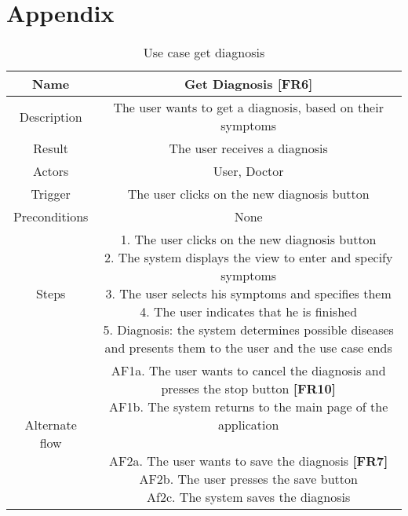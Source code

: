 

\chapter{Appendix}
\begin{table}[H]
	\begin{center}\scriptsize
		\def\arraystretch{2}%
		\begin{tabular}{ |c|c| } 
			\hline
			Name & Get Diagnosis \textbf{[FR6]}\\
			\hline	
			Description & The user wants to get a diagnosis, based on their symptoms \\ 
			\hline
			Result & The user receives a diagnosis \\ 
			\hline
			Actors & User, Doctor \\ 
			\hline
			Trigger & The user clicks on the new diagnosis button \\ 
			\hline
			Preconditions & None \\ 
			\hline
			Steps & \parbox{9cm}{\vspace{.5\baselineskip}
				1. The user clicks on the new diagnosis button\\
				2. The system displays the view to enter and specify symptoms\\
				3. The user selects his symptoms and specifies them\\
				4. The user indicates that he is finished\\
				5. Diagnosis: the system determines possible diseases and presents them to the user and the use case ends}\\
			\hline
			Alternate flow & \parbox{9cm}{
				AF1a. The user wants to cancel the diagnosis and presses the stop button \textbf{[FR10]}\\
				AF1b. The system returns to the main page of the application\\\\
				AF2a. The user wants to save the diagnosis \textbf{[FR7]}\\
				AF2b. The user presses the save button\\
				Af2c. The system saves the diagnosis
			}\\ 
			\hline
		\end{tabular}\normalsize
	\end{center}
	\caption{Use case get diagnosis}
\end{table}
